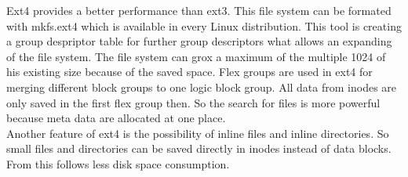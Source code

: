 Ext4 provides a better performance than ext3. 
This file system can be formated with mkfs.ext4 which is available in every Linux distribution.
This tool is creating a group despriptor table for further group descriptors what allows an expanding of the file system. The file system can grox a maximum of the multiple 1024 of his existing size because of the saved space\cite[p.21]{Seufert2015}.
Flex groups are used in ext4 for merging different block groups to one logic block group. All data from inodes are only saved in the first flex group then. 
So the search for files is more powerful because meta data are allocated at one place. \\

Another feature of ext4 is the possibility of inline files and inline directories. So small files and directories can be saved directly in inodes instead of data blocks. From this follows less disk space consumption\cite[p.24]{Seufert2015}.


